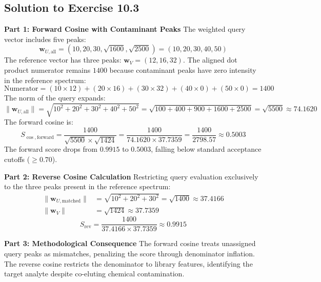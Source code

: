 \documentclass[11pt,twoside,openright]{book}
\begin{document}
\subsection{Solution to Exercise 10.3}

\noindent\textbf{Part 1: Forward Cosine with Contaminant Peaks}\enspace
The weighted query vector includes five peaks:
\begin{equation*}
\mathbf{w}_{U, \text{all}} = (10, 20, 30, \sqrt{1600}, \sqrt{2500}) = (10, 20, 30, 40, 50)
\end{equation*}
The reference vector has three peaks: $\mathbf{w}_V = (12, 16, 32)$.
The aligned dot product numerator remains $1400$ because contaminant peaks have zero intensity in the reference spectrum:
\begin{equation*}
\text{Numerator} = (10 \times 12) + (20 \times 16) + (30 \times 32) + (40 \times 0) + (50 \times 0) = 1400
\end{equation*}
The norm of the query expands:
\begin{equation*}
\|\mathbf{w}_{U, \text{all}}\| = \sqrt{10^2 + 20^2 + 30^2 + 40^2 + 50^2} = \sqrt{100 + 400 + 900 + 1600 + 2500} = \sqrt{5500} \approx 74.1620
\end{equation*}
The forward cosine is:
\begin{equation*}
S_{\cos, \text{forward}} = \frac{1400}{\sqrt{5500} \times \sqrt{1424}} = \frac{1400}{74.1620 \times 37.7359} = \frac{1400}{2798.57} \approx 0.5003
\end{equation*}
The forward score drops from $0.9915$ to $0.5003$, falling below standard acceptance cutoffs ($\ge 0.70$).

\noindent\textbf{Part 2: Reverse Cosine Calculation}\enspace
Restricting query evaluation exclusively to the three peaks present in the reference spectrum:
\begin{align*}
\|\mathbf{w}_{U, \text{matched}}\| &= \sqrt{10^2 + 20^2 + 30^2} = \sqrt{1400} \approx 37.4166 \\
\|\mathbf{w}_V\| &= \sqrt{1424} \approx 37.7359
\end{align*}
\begin{equation*}
S_{\text{rev}} = \frac{1400}{37.4166 \times 37.7359} \approx 0.9915
\end{equation*}

\noindent\textbf{Part 3: Methodological Consequence}\enspace
The forward cosine treats unassigned query peaks as mismatches, penalizing the score through denominator inflation. The reverse cosine restricts the denominator to library features, identifying the target analyte despite co-eluting chemical contamination.
\end{document}
